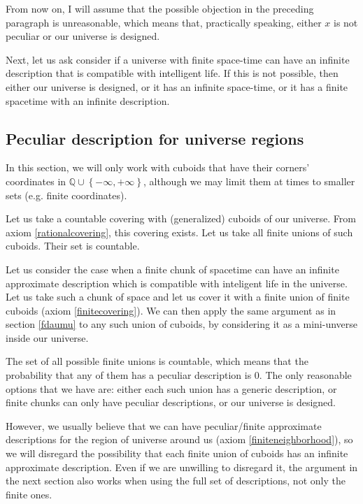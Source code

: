 \documentclass[a4paper
,draft
]{article}
\def\rationale{\mathbb{Q}}
\newcommand{\multime}[1]{\left\{ #1 \right\}}
\begin{document}
From now on, I will assume that the possible objection in the preceding
paragraph is unreasonable, which means that, practically speaking,
either $x$ is not peculiar or our universe is designed.

Next, let us ask consider if a universe with finite space-time can have an
infinite description that is compatible with intelligent life. If this is not
possible, then either our universe is designed, or it has an infinite
space-time, or it has a finite spacetime with an infinite description.

\subsection{Peculiar description for universe regions}

In this section, we will only work with cuboids that have their
corners' coordinates
in $\rationale\cup\multime{-\infty, +\infty}$, although we may limit
them at times to smaller sets (e.g. finite coordinates).

Let us take a countable covering with (generalized) cuboids of our universe.
From axiom \ref{rationalcovering}, this covering exists.
Let us take all finite unions of such cuboids. Their set is countable.

Let us consider the case when a finite chunk of spacetime can
have an infinite approximate
description which is compatible with inteligent life in the universe.
Let us take such a chunk of space and let us cover it with a finite union of
finite cuboids (axiom \ref{finitecovering}).
We can then apply the same argument as in section \ref{fdaumu} to any
such union of cuboids, by considering it as a mini-unverse inside
our universe.

The set of all possible finite unions is countable,
which means that the probability that any of them has a peculiar
description is $0$. The only reasonable options that we have are:
either each such union has a generic description,
or finite chunks can only have peculiar descriptions, or our universe
is designed.

However, we usually believe that we can have peculiar/finite
approximate descriptions
for the region of universe around us (axiom \ref{finiteneighborhood}), so we
will disregard the possibility that each finite union of cuboids has an
infinite approximate description. Even if we are unwilling to disregard it,
the argument in the next section also works when using the full set of
descriptions, not only the finite ones.
\end{document}
